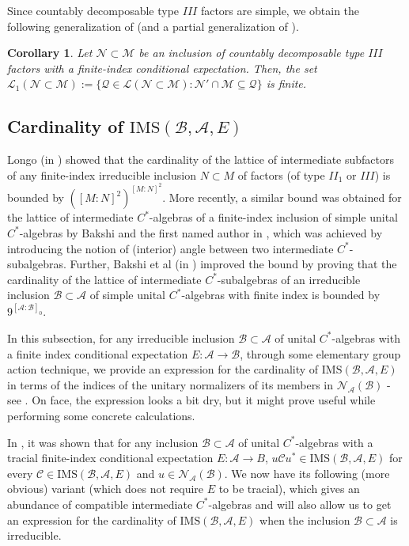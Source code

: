 \documentclass{amsart}
\numberwithin{equation}{section}
\newcommand{\IMS}{\mathrm{IMS}}
\newcommand{\mcal}{\mathcal}
\newcommand{\1}{\mathbf{1}}
\newcommand{\mA}{\mathcal{A}}
\newcommand{\mB}{\mathcal{B}}
\newcommand{\mC}{\mathcal{C}}
\newcommand{\mM}{\mathcal{M}}
\newcommand{\mN}{\mathcal{N}}
\newtheorem{cor}[theorem]{Corollary}
\begin{document}
Since countably decomposable type $III$ factors are simple, we obtain
the following generalization of \cite[Theorem 2.5]{TW} (and a partial
generalization of \cite[Theorem 1.3]{KM}).
\begin{cor}
Let $\mcal{N}\subset \mcal{M}$ be an inclusion of countably
decomposable type $III$ factors with a finite-index conditional
expectation. Then, the set $\mcal{L}_1(\mN \subset \mM):=\{
\mathcal{Q} \in \mcal{L}(\mN \subset \mM): \mN' \cap \mcal{M}
\subseteq \mcal{Q} \}$ is finite.
\end{cor} 


\subsection{Cardinality of $\IMS(\mB, \mA, E)$}

Longo (in \cite{Longo}) showed that the cardinality of the lattice of
intermediate subfactors of any finite-index irreducible inclusion $N
\subset M$ of factors (of type $II_1$ or $III$) is bounded by
$([M:N]^2)^{[M:N]^2}$. More recently, a similar bound was obtained for
the lattice of intermediate $C^*$-algebras of a finite-index inclusion
of simple unital $C^*$-algebras by Bakshi and the first named author
in \cite{BG}, which was achieved by introducing the notion of (interior)
angle between two intermediate $C^*$-subalgebras. Further, Bakshi et
al (in \cite{BE}) improved the bound by proving that the cardinality
of the lattice of intermediate $C^*$-subalgebras of an irreducible
inclusion $\mB\subset \mA$ of simple unital $C^*$-algebras with finite
index is bounded by $9^{[\mA : \mB]_{0}}$.

In this subsection, for any irreducible inclusion $\mB \subset\mA$ of
unital $C^*$-algebras with a finite index conditional expectation $E: \mA \to \mB$,
through some elementary group action technique, we provide an
expression for the cardinality of $\IMS(\mB, \mA, E)$ in terms of the
indices of the unitary normalizers of its members in $\mN_{\mA}(\mB)$ - see
. On face, the expression looks a bit dry,
but it might prove useful while performing some concrete calculations.

In \cite[Lemma 2.8(2)]{GS}, it was shown that for any inclusion $\mB
\subset \mA$ of unital $C^*$-algebras with a tracial finite-index
conditional expectation $E: \mA \to B$, $u \mC u^* \in \IMS(\mB, \mA, E)$
for every $\mC\in \IMS(\mB, \mA, E)$ and $u \in \mN_{\mA}(\mB)$. We now
have its following (more obvious) variant (which does not require $E$
to be tracial), which gives an abundance of compatible intermediate
$C^*$-algebras and will also allow us to get an expression for the
cardinality of $\IMS(\mB, \mA, E)$ when the inclusion $\mB \subset
\mA$ is irreducible.
\end{document}
